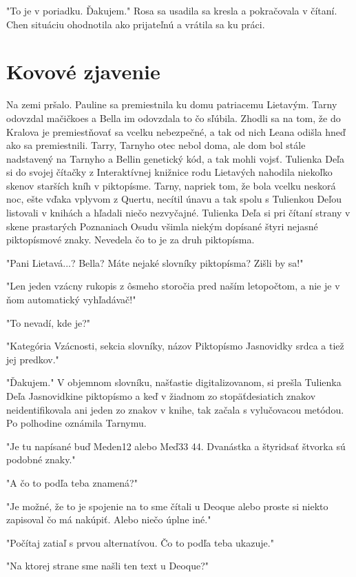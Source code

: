 \documentclass{book}
\begin{document}
"$ $To je v poriadku. Ďakujem."$ $  Rosa sa usadila sa kresla a pokračovala v čítaní. Chen situáciu ohodnotila ako prijateľnú a vrátila sa ku práci.

\chapter{Kovové zjavenie}

Na zemi pršalo. Pauline sa premiestnila ku domu patriacemu Lietavým. Tarny odovzdal mačičkoes a Bella im odovzdala to čo sľúbila. Zhodli sa na tom, že do Kralova je premiestňovať sa vcelku nebezpečné, a tak od nich Leana odišla hneď ako sa premiestnili. Tarry, Tarnyho otec nebol doma, ale dom bol stále nadstavený na Tarnyho a Bellin genetický kód, a tak mohli vojsť. Tulienka Deľa si do svojej čítačky z Interaktívnej knižnice rodu Lietavých nahodila niekoľko skenov starších kníh v piktopísme. Tarny, napriek tom, že bola vcelku neskorá noc, ešte vďaka vplyvom z Quertu, necítil únavu a tak spolu s Tulienkou Deľou listovali v knihách a hľadali niečo nezvyčajné. Tulienka Deľa si pri čítaní strany v skene prastarých Poznaniach Osudu všimla niekým dopísané štyri nejasné piktopísmové znaky. Nevedela čo to je za druh piktopísma.

"$ $Pani Lietavá...? Bella? Máte nejaké slovníky piktopísma? Zišli by sa!"$ $ 

"$ $Len jeden vzácny rukopis z ôsmeho storočia pred naším letopočtom, a nie je v ňom automatický vyhľadávač!"$ $ 

"$ $To nevadí, kde je?"$ $ 

"$ $Kategória Vzácnosti, sekcia slovníky, názov Piktopísmo Jasnovidky srdca a tiež jej predkov."$ $ 

"$ $Ďakujem."$ $  V objemnom slovníku, našťastie digitalizovanom, si prešla Tulienka Deľa Jasnovidkine piktopísmo a keď v žiadnom zo stopäťdesiatich znakov neidentifikovala ani jeden zo znakov v knihe, tak začala s vylučovacou metódou. Po polhodine oznámila Tarnymu.

"$ $Je tu napísané buď Meden12 alebo Meď33 44. Dvanástka a štyridsať štvorka sú podobné znaky."$ $ 

"$ $A čo to podľa teba znamená?"$ $ 

"$ $Je možné, že to je spojenie na to sme čítali u Deoque alebo proste si niekto zapisoval čo má nakúpiť. Alebo niečo úplne iné."$ $ 

"$ $Počítaj zatiaľ s prvou alternatívou. Čo to podľa teba ukazuje."$ $ 

"$ $Na ktorej strane sme našli ten text u Deoque?"$ $ 
\end{document}
